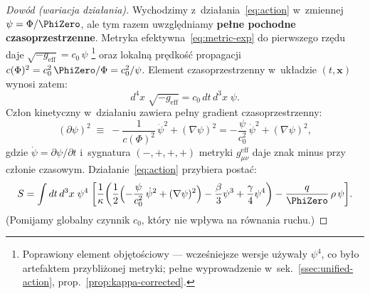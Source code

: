 \begin{proof}[Dow\'od (wariacja dzia\l{}ania)]
Wychodzimy z~dzia\l{}ania~\eqref{eq:action} w~zmiennej
$\psi = \Phi/\PhiZero$, ale tym razem uwzgl\k{e}dniamy
\textbf{pe\l{}ne pochodne czasoprzestrzenne}. Metryka
efektywna~\eqref{eq:metric-exp} do pierwszego rz\k{e}du daje
$\sqrt{-g_{\mathrm{eff}}} = c_0\,\psi$%
\footnote{Poprawiony element obj\k{e}to\'sciowy ---
  wcze\'sniejsze wersje u\.zywa\l{}y $\psi^4$, co by\l{}o
  artefaktem przybli\.zonej metryki; pe\l{}ne wyprowadzenie
  w~sek.~\ref{ssec:unified-action}, prop.~\ref{prop:kappa-corrected}.}
oraz lokaln\k{a}
pr\k{e}dko\'s\'c propagacji $c(\Phi)^2 = c_0^2\,\PhiZero/\Phi
= c_0^2/\psi$. Element czasoprzestrzenny w~uk\l{}adzie
$(t, \mathbf{x})$ wynosi zatem:
\[
  d^4x\;\sqrt{-g_{\mathrm{eff}}}
  = c_0\,dt\,d^3x\;\psi.
\]
Cz\l{}on kinetyczny w~dzia\l{}aniu zawiera pe\l{}ny gradient
czasoprzestrzenny:
\begin{equation}\label{eq:kinetic-full}
  (\partial\psi)^2 \;\equiv\;
  -\frac{1}{c(\Phi)^2}\,\dot\psi^2 + (\nabla\psi)^2
  = -\frac{\psi}{c_0^2}\,\dot\psi^2 + (\nabla\psi)^2,
\end{equation}
gdzie $\dot\psi = \partial\psi/\partial t$ i~sygnatura
$(-,+,+,+)$ metryki $g_{\mu\nu}^{\mathrm{eff}}$ daje znak minus
przy cz\l{}onie czasowym. Dzia\l{}anie~\eqref{eq:action} przybiera
posta\'c:
\begin{equation}\label{eq:action-full-psi}
  S = \int dt\,d^3x\;\psi^4\;\biggl[
    \frac{1}{\kappa}\biggl(
      \frac{1}{2}\Bigl(
        -\frac{\psi}{c_0^2}\,\dot\psi^2 + (\nabla\psi)^2
      \Bigr)
      - \frac{\beta}{3}\psi^3 + \frac{\gamma}{4}\psi^4
    \biggr)
    - \frac{q}{\PhiZero}\,\rho\,\psi
  \biggr].
\end{equation}
(Pomijamy globalny czynnik $c_0$, kt\'ory nie wp\l{}ywa na
r\'ownania ruchu.)


\end{proof}
